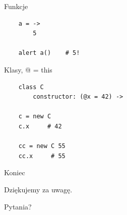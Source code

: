 \documentclass[xcolor=dvipsnames]{beamer}
\begin{document}
\begin{frame}[fragile]{Funkcje}
    
    \begin{verbatim}
    a = ->
        5

    alert a()    # 5!
    \end{verbatim}
\end{frame}

\begin{frame}[fragile]{Klasy, @ = this}
    
    \begin{verbatim}
    class C
        constructor: (@x = 42) ->

    c = new C
    c.x     # 42

    cc = new C 55
    cc.x     # 55

    \end{verbatim}
\end{frame}

\begin{frame}[fragile]{Koniec}
    \begin{center}
        Dziękujemy za uwagę.
        
        \vspace{2 cm}
        \pause
        Pytania?
    \end{center}
\end{frame}
\end{document}
